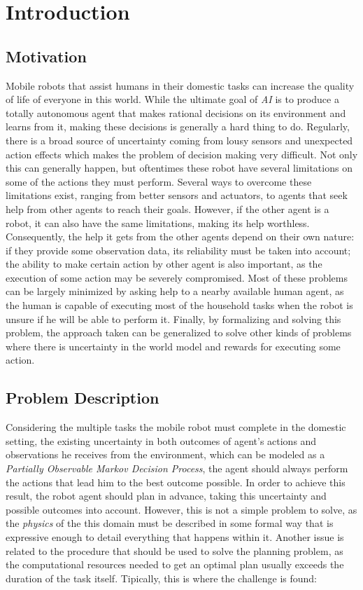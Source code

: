 
\chapter{Introduction}


\section{Motivation}

Mobile robots that assist humans in their domestic tasks can increase the
quality of life of everyone in this world. While the ultimate goal of
\textit{AI} is to produce a totally autonomous agent that makes rational
decisions on its environment and learns from it, making these
decisions is generally a hard thing to do. Regularly, there is a broad source of
uncertainty coming from lousy sensors and unexpected action effects which makes
the problem of decision making very difficult. Not only this can generally
happen, but oftentimes these robot have several limitations on some of the
actions they must perform. Several ways to overcome these limitations exist,
ranging from better sensors and actuators, to agents that seek help from
other agents to reach their goals. However, if the other agent is a robot, it
can also have the same limitations, making its help worthless. Consequently, the
help it gets from the other agents depend on their own nature: if they provide
some observation data, its reliability must be taken into account; the ability
to make certain action by other agent is also important, as the execution of
some action may be severely compromised. Most of these problems can be largely
minimized by asking help to a nearby available human agent, as the human is
capable of executing most of the household tasks when the robot is unsure if
he will be able to perform it. Finally, by formalizing and solving this problem,
the approach taken can be generalized to solve other kinds of problems where
there is uncertainty in the world model and rewards for executing some action.

\section{Problem Description}

Considering the multiple tasks the mobile robot must complete in the domestic
setting, the existing uncertainty in both outcomes of agent's actions and
observations he receives from the environment, which can be modeled as a
\textit{Partially Observable Markov Decision Process}, the
agent should always perform the actions that lead him to the best outcome
possible. In order to achieve this result, the robot agent should plan in
advance, taking this uncertainty and possible outcomes into account. However,
this is not a simple problem to solve, as the \textit{physics} of the this
domain must be described in some formal way that is expressive enough to detail
everything that happens within it. Another issue is related to the procedure
that should be used to solve the planning problem, as the computational
resources needed to get an optimal plan usually exceeds the duration of the task
itself. Tipically, this is where the challenge is found:

